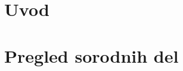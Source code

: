 \mainmatter
\setcounter{page}{1}
\pagestyle{fancy}

\chapter{Uvod}
    
\chapter{Pregled sorodnih del}

